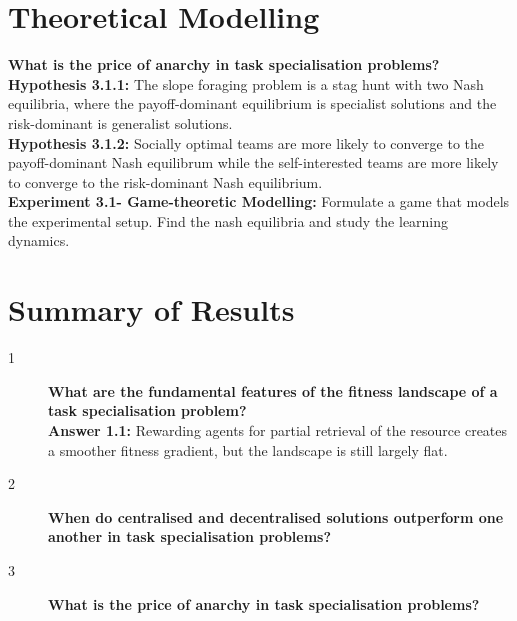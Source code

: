 \documentclass[12pt]{article}
\begin{document}
\section{Theoretical Modelling}

\textbf{What is the price of anarchy in task specialisation problems?}\\

\textbf{Hypothesis 3.1.1:} The slope foraging problem is a stag hunt with two Nash equilibria, where the payoff-dominant equilibrium is specialist solutions and the risk-dominant is generalist solutions.\\

\textbf{Hypothesis 3.1.2:} Socially optimal teams are more likely to converge to the payoff-dominant Nash equilibrum while the self-interested teams are more likely to converge to the risk-dominant Nash equilibrium.\\

\textbf{Experiment 3.1- Game-theoretic Modelling:} Formulate a game that models the experimental setup. 
Find the nash equilibria and study the learning dynamics.\\




\appendix

\section{Summary of Results}

\begin{description}
\item[1] \textbf{What are the fundamental features of the fitness landscape of a task specialisation problem?}\\

\textbf{Answer 1.1:} Rewarding agents for partial retrieval of the resource creates a smoother fitness gradient, but the landscape is still largely flat.\\

\item[2] \textbf{When do centralised and decentralised solutions outperform one another in task specialisation problems?}\\



\item[3] \textbf{What is the price of anarchy in task specialisation problems?}\\



\end{description}
\end{document}

